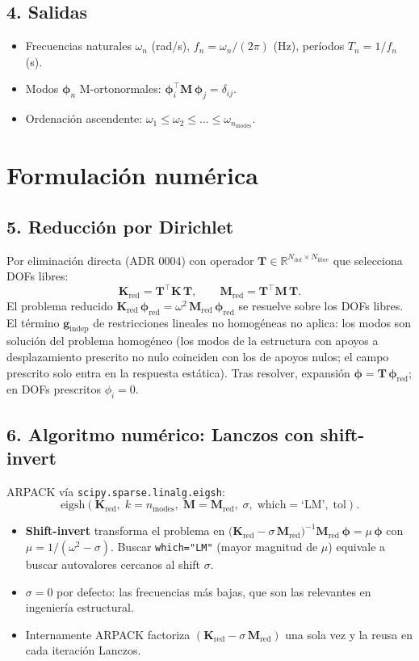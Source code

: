 \documentclass[11pt,letterpaper,oneside]{report}
\begin{document}
\subsection{4. Salidas}
\begin{itemize}
  \item Frecuencias naturales $\omega_n$ (rad/s), $f_n = \omega_n/(2\pi)$ (Hz), períodos $T_n = 1/f_n$ (s).
  \item Modos $\boldsymbol\phi_n$ M-ortonormales: $\boldsymbol\phi_i^\top \mathbf M\, \boldsymbol\phi_j = \delta_{ij}$.
  \item Ordenación ascendente: $\omega_1 \le \omega_2 \le \ldots \le \omega_{n_\text{modes}}$.
\end{itemize}


\section{Formulación numérica}

\subsection{5. Reducción por Dirichlet}
Por eliminación directa (ADR 0004) con operador $\mathbf T \in \mathbb R^{N_\text{dof} \times N_\text{libre}}$ que selecciona DOFs libres:
\[
\mathbf K_\text{red} = \mathbf T^\top \mathbf K\, \mathbf T, \qquad \mathbf M_\text{red} = \mathbf T^\top \mathbf M\, \mathbf T.
\]
El problema reducido $\mathbf K_\text{red}\,\boldsymbol\phi_\text{red} = \omega^2\, \mathbf M_\text{red}\,\boldsymbol\phi_\text{red}$ se resuelve sobre los DOFs libres. El término $\mathbf g_\text{indep}$ de restricciones lineales no homogéneas no aplica: los modos son solución del problema homogéneo (los modos de la estructura con apoyos a desplazamiento prescrito no nulo coinciden con los de apoyos nulos; el campo prescrito solo entra en la respuesta estática). Tras resolver, expansión $\boldsymbol\phi = \mathbf T\,\boldsymbol\phi_\text{red}$; en DOFs prescritos $\phi_i = 0$.

\subsection{6. Algoritmo numérico: Lanczos con shift-invert}
ARPACK vía \texttt{scipy.sparse.linalg.eigsh}:
\[
\text{eigsh}(\mathbf K_\text{red},\; k = n_\text{modes},\; \mathbf M = \mathbf M_\text{red},\; \sigma,\; \text{which}\!=\!\text{`LM'},\; \text{tol}).
\]
\begin{itemize}
  \item \textbf{Shift-invert} transforma el problema en $\bigl(\mathbf K_\text{red} - \sigma\,\mathbf M_\text{red}\bigr)^{-1}\mathbf M_\text{red}\,\boldsymbol\phi = \mu\,\boldsymbol\phi$ con $\mu = 1/(\omega^2 - \sigma)$. Buscar \texttt{which="LM"} (mayor magnitud de $\mu$) equivale a buscar autovalores cercanos al shift $\sigma$.
  \item $\sigma = 0$ por defecto: las frecuencias más bajas, que son las relevantes en ingeniería estructural.
  \item Internamente ARPACK factoriza $(\mathbf K_\text{red} - \sigma\,\mathbf M_\text{red})$ una sola vez y la reusa en cada iteración Lanczos.
\end{itemize}
\end{document}
